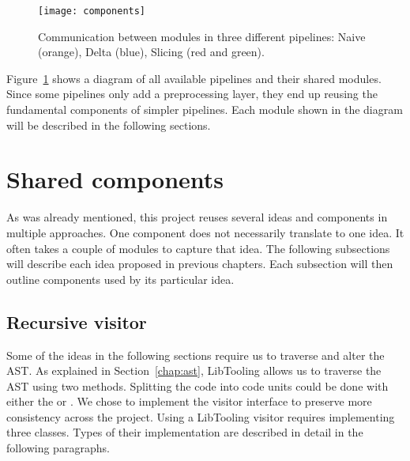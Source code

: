 \begin{figure}[h]\centering
\texttt{[image: components]}
\caption{Communication between modules in three different pipelines:
Naive (orange), Delta (blue), Slicing (red and green).}
\label{img:components}
\end{figure}

Figure~\ref{img:components} shows a diagram of all available pipelines and 
their shared modules. 
Since some pipelines only add a preprocessing layer, they end up reusing 
the fundamental components of simpler pipelines.
Each module shown in the diagram will be described in the following sections.

\section{Shared components}\label{chap:components}

As was already mentioned, this project reuses several ideas and components 
in multiple approaches. 
One component does not necessarily translate to one idea. 
It often takes a couple of modules to capture that idea. 
The following subsections will describe each idea proposed in previous 
chapters. 
Each subsection will then outline components used by its particular idea.

\subsection*{Recursive visitor}

Some of the ideas in the following sections require us to traverse and alter 
the AST.
As explained in Section~\ref{chap:ast}, LibTooling allows us to traverse 
the AST using two methods. 
Splitting the code into code units could be done with either 
the  or . 
We chose to implement the visitor interface to preserve more consistency 
across the project. 
Using a LibTooling visitor requires implementing three classes. 
Types of their implementation are described in detail in the following 
paragraphs.

